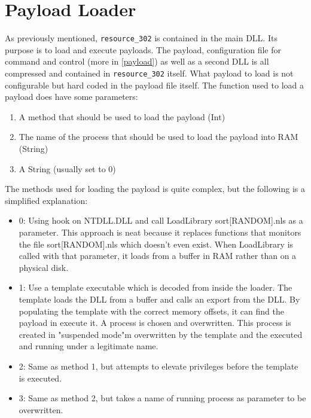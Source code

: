 \documentclass[11pt,english,a4paper]{report}
\begin{document}
\section{Payload Loader}
As previously mentioned, \texttt{resource\_302} is contained in the main DLL. Its purpose is to load and execute payloads. The payload, configuration file for command and control (more in \ref{payload}) as well as a second DLL is all compressed and contained in \texttt{resource\_302} itself. What payload to load is not configurable but hard coded in the payload file itself. The function used to load a payload does have some parameters:
 \begin{enumerate}
   \item A method that should be used to load the payload (Int)
   \item The name of the process that should be used to load the payload into RAM (String)
   \item A String (usually set to 0)
  \end{enumerate}
The methods used for loading the payload is quite complex, but the following is a simplified explanation:
  \begin{itemize}[label={}]
    \item 0: Using hook on NTDLL.DLL and call LoadLibrary sort[RANDOM].nls as a parameter. This approach is neat because it replaces functions that monitors the file sort[RANDOM].nls which doesn't even exist. When LoadLibrary is called with that parameter, it loads from a buffer in RAM rather than on a physical disk.
    \item 1: Use a template executable which is decoded from inside the loader. The template loads the DLL from a buffer and calls an export from the DLL. By populating the template with the correct memory offsets, it can find the payload in execute it. A process is chosen and overwritten. This process is created in "suspended mode"m overwritten by the template and the executed and running under a legitimate name.
    \item 2: Same as method 1, but attempts to elevate privileges before the template is executed. 
    \item 3: Same as method 2, but takes a name of running process as parameter to be overwritten.
  \end{itemize}
\end{document}
